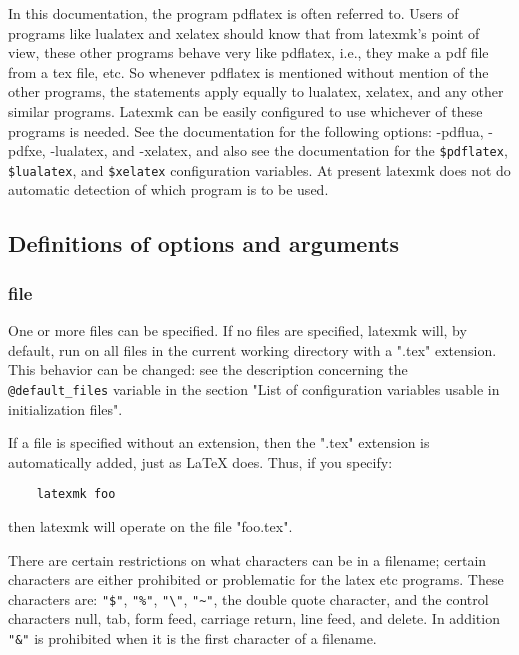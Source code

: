 In this documentation, the program pdflatex is often referred to.
Users of programs like lualatex and xelatex should know that  from latexmk's
point  of view, these other programs behave very like pdflatex, i.e., they
make a pdf file from a  tex  file,  etc.   So  whenever pdflatex is mentioned
without mention of the other programs, the statements apply equally to
lualatex, xelatex, and any  other  similar  programs.  Latexmk can be easily
configured to use whichever of these programs is needed.  See the
documentation  for  the  following  options: -pdflua,  -pdfxe,  -lualatex, and
-xelatex, and also see the documentation for the \verb|$pdflatex|,
\verb|$lualatex|,  and  \verb|$xelatex|  configuration  variables.   At
present  latexmk  does not do automatic detection of which program is to be
used.

\subsection{Definitions of options and arguments}

\subsubsection{file}

One or more files can be specified.  If no files are  specified, latexmk  will,
by default, run on all files in the current working directory with a ".tex"
extension.   This  behavior  can  be changed: see the description concerning
the \verb|@default_files| variable in the section "List of configuration
variables  usable  in initialization files".

If a file is specified without an extension, then the ".tex" extension is
automatically added, just as LaTeX  does.   Thus,  if you specify:

\begin{verbatim}
	latexmk foo
\end{verbatim}

then latexmk will operate on the file "foo.tex".

There  are  certain  restrictions on what characters can be in a filename;
certain characters are either prohibited  or  problematic  for  the  latex
etc programs.  These characters are: \verb|"$"|, \verb|"%"|, \verb|"\"|,
\verb|"~"|, the double quote character, and the control characters  null,
tab,  form  feed, carriage return, line feed, and delete.  In addition
\verb|"&"| is prohibited  when  it  is  the  first character of a filename.

